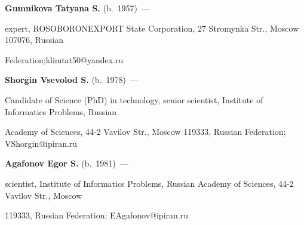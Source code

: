 \vspace*{3pt}



\noindent

\textbf{Gumnikova Tatyana S.} (b.\ 1957)~---

expert, ROSOBORONEXPORT State Corporation, 27 Stromynka Str., Moscow 107076, Russian

Federation;\linebreak klimtat50@yandex.ru



\vspace*{3pt}



\noindent

\textbf{Shorgin Vsevolod S.} (b.\ 1978)~---

Candidate of Science (PhD) in technology, senior scientist, Institute of Informatics Problems, Russian

Academy of Sciences,  44-2 Vavilov Str., Moscow 119333, Russian Federation; VShorgin@ipiran.ru



\vspace*{3pt}



\noindent

\textbf{Agafonov Egor S.} (b.\ 1981)~---

scientist, Institute of Informatics Problems, Russian Academy of Sciences,  44-2 Vavilov Str., Moscow

119333, Russian Federation; EAgafonov@ipiran.ru



\label{end\stat}



\renewcommand{\bibname}{\protect\rmfamily Литература}



